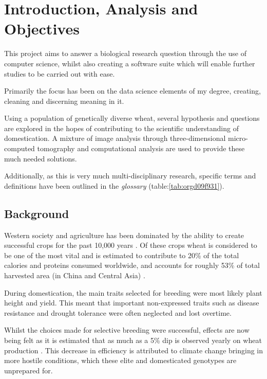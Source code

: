 \documentclass[11pt]{report}
\begin{document}
\chapter{Introduction, Analysis and Objectives}
\label{sec:org242e0ef}

This project aims to answer a biological research question through the use of computer science, whilst also creating a software suite which will enable further studies to be carried out with ease.

Primarily the focus has been on the data science elements of my degree, creating, cleaning and discerning meaning in it.

Using a population of genetically diverse wheat, several hypothesis and questions are explored in the hopes of contributing to the scientific understanding of domestication. A mixture of image analysis through three-dimensional micro-computed tomography and computational analysis are used to provide these much needed solutions.

Additionally, as this is very much multi-disciplinary research, specific terms and definitions have been outlined in the \emph{glossary} (table:\ref{tab:orgd09f931}).

\section{Background}
\label{sec:orgec0b5f6}

Western society and agriculture has been dominated by the ability to create successful crops for the past 10,000 years \cite{Ozkan2002}. Of these crops wheat is considered to be one of the most vital and is estimated to contribute to 20\% of the total calories and proteins consumed worldwide, and accounts for roughly 53\% of total harvested area (in China and Central Asia) \cite{Shiferaw2013}.

During domestication, the main traits selected for breeding were most likely plant height and yield. This meant that important non-expressed traits such as disease resistance and drought tolerance were often neglected and lost overtime.

Whilst the choices made for selective breeding were successful, effects are now being felt as it is estimated that as much as a 5\% dip is observed yearly on wheat production \cite{Shiferaw2013}. This decrease in efficiency is attributed to climate change bringing in more hostile conditions, which these elite and  domesticated genotypes are unprepared for.
\end{document}

